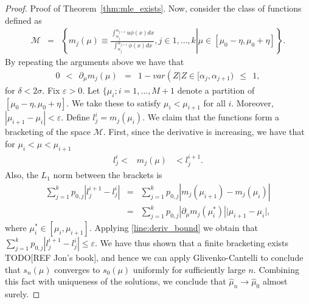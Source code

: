 \documentclass[12pt]{article} %
\newcommand{\comH}[1]{{\noindent \color{blue}#1}}
\newcommand{\eps}{\varepsilon}
\begin{document}
\begin{proof}{Proof of Theorem~\ref{thm:mle_exists}.}
Now, consider the class of functions defined as 
\begin{eqnarray*}
\mathcal M &=&\left\{\left. m_j(\mu) \equiv \frac{\int_{\alpha_j}^{\alpha_{j+1}}  u \phi(x)dx}{  \int_{\alpha_j}^{\alpha_{j+1}}  \phi(x)dx}, j\in 1, \ldots, k \right\vert \mu \in [\mu_0-\eta, \mu_0+\eta]\right\}.
\end{eqnarray*}
By repeating the arguments above we have that 
\begin{eqnarray}\label{line:deriv_bound}
0\ \ < \ \ \partial_\mu m_j(\mu) &=& 1-var\left(Z\vert Z \in [\alpha_{j},\alpha_{j+1}) \ \ \leq \ \ 1,
\end{eqnarray}
for $\delta<2\sigma.$
Fix $\eps>0.$  Let $\{\mu_i; i=1, \ldots, M+1$ denote a partition of $[\mu_0-\eta, \mu_0+\eta].$  We take these to satisfy $\mu_i < \mu_{i+1}$ for all $i.$  Moreover, $|\mu_{i+1}-\mu_i| < \eps.$
Define $l_j^i= m_j(\mu_i).$   We claim that the functions form a bracketing of the space $\mathcal M.$  First, since the derivative is increasing, we have that for $\mu_i < \mu < \mu_{i+1}$
\begin{eqnarray*}
l_j^i < &m_j(\mu)& < l_j^{i+1}.
\end{eqnarray*}
Also, the $L_1$ norm between the brackets is 
\begin{eqnarray*}
\sum_{j=1}^k p_{0,j} \left\vert l_j^{i+1}-l_j^{i} \right \vert &= & \sum_{j=1}^k p_{0,j} \left\vert  m_j(\mu_{i+1})- m_j(\mu_i) \right \vert \\
&= & \sum_{j=1}^k p_{0,j} \left\vert  \partial_\mu m_j(\mu^*_{i})\right \vert \vert \mu_{i+1} -\mu_i\vert,
\end{eqnarray*}
where $\mu^*_i \in [\mu_i,\mu_{i+1}].$   Applying \eqref{line:deriv_bound} we obtain that $\sum_{j=1}^k p_{0,j} \left\vert l_j^{i+1}-l_j^{i} \right \vert \leq \eps.$
We have thus shown that a finite bracketing exists \comH{TODO[REF Jon's book]}, and hence we can apply Glivenko-Cantelli to conclude that $s_n(\mu)$ converges to $s_0(\mu)$ uniformly for sufficiently large $n.$  Combining this fact with uniqueness of the solutions, we conclude that $\widehat \mu_n \rightarrow \widehat \mu_0$ almost surely.
\end{proof}

\bigskip
\end{document}
